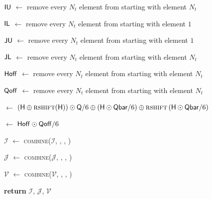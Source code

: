 \begin{vAlgorithm}[!ht]{1\columnwidth}{0em}
{{{		}

	}

}

$\textup{\textsf{IU}}$ $\gets$ remove every $N_t$ element from  starting with element $N_t$ 

$\textup{\textsf{IL}}$ $\gets$ remove every $N_t$ element from  starting with element $1$ 

$\textup{\textsf{JU}}$ $\gets$ remove every $N_t$ element from  starting with element $1$ 

$\textup{\textsf{JL}}$ $\gets$ remove every $N_t$ element from  starting with element $N_t$ 

$\textup{\textsf{Hoff}}$ $\gets$ remove every $N_t$ element from  starting with element $N_t$ 

$\textup{\textsf{Qoff}}$ $\gets$ remove every $N_t$ element from  starting with element $N_t$ 

 $\leftarrow$  $\left( \textup{\textsf{H}} \oplus \textsc{rshift}(\textup{\textsf{H}})  \right) \odot \textup{\textsf{Q}}/6 \oplus
\left( \textup{\textsf{H}}\odot \textup{\textsf{Qbar}}/6  \right) \oplus
\textsc{rshift}\left( \textup{\textsf{H}} \odot \textup{\textsf{Qbar}}/6 \right)
$ \label{line:ch5:V}

 $\gets$ $\textup{\textsf{Hoff}} \odot \textup{\textsf{Qoff}}/6$ \label{line:ch5:Voff}

$\mathcal{I}$ $\gets$ \textsc{combine}($\mathcal{I}$, , , )

$\mathcal{J}$ $\gets$ \textsc{combine}($\mathcal{J}$, , , )

$\mathcal{V}$ $\gets$ \textsc{combine}($\mathcal{V}$, , , )

\textbf{return} $\mathcal{I}$, $\mathcal{J}$, $\mathcal{V}$ 

\vspace*{0.1in}


\end{vAlgorithm}